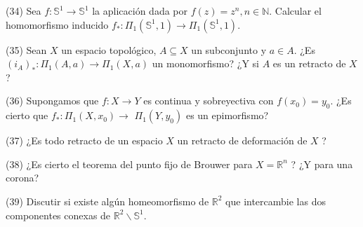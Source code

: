 \documentclass[
  a4paper,
  spanish,
  12pt,
]{scrartcl}
\begin{document}
\begin{ejer}
(34) Sea $f: \mathbb{S}^{1} \rightarrow \mathbb{S}^{1}$ la aplicación dada por $f(z)=z^{n}, n \in \mathbb{N}$. Calcular el homomorfismo inducido $f_{*}: \Pi_{1}\left(\mathbb{S}^{1}, 1\right) \rightarrow \Pi_{1}\left(\mathbb{S}^{1}, 1\right)$.\\
\end{ejer}

\begin{ejer}
(35) Sean $X$ un espacio topológico, $A \subseteq X$ un subconjunto y $a \in A$. ¿Es $\left(i_{A}\right)_{*}: \Pi_{1}(A, a) \rightarrow \Pi_{1}(X, a)$ un monomorfismo? ¿Y si $A$ es un retracto de $X$ ?\\
\end{ejer}

\begin{ejer}
(36) Supongamos que $f: X \rightarrow Y$ es continua y sobreyectiva con $f\left(x_{0}\right)=y_{0}$. ¿Es cierto que $f_{*}: \Pi_{1}\left(X, x_{0}\right) \rightarrow$ $\Pi_{1}\left(Y, y_{0}\right)$ es un epimorfismo?\\
\end{ejer}

\begin{ejer}
(37) ¿Es todo retracto de un espacio $X$ un retracto de deformación de $X$ ?\\
\end{ejer}

\begin{ejer}
(38) ¿Es cierto el teorema del punto fijo de Brouwer para $X=\mathbb{R}^{n}$ ? ¿Y para una corona?\\
\end{ejer}

\begin{ejer}
(39) Discutir si existe algún homeomorfismo de $\mathbb{R}^{2}$ que intercambie las dos componentes conexas de $\mathbb{R}^{2} \backslash \mathbb{S}^{1}$.
\end{ejer}
\end{document}

